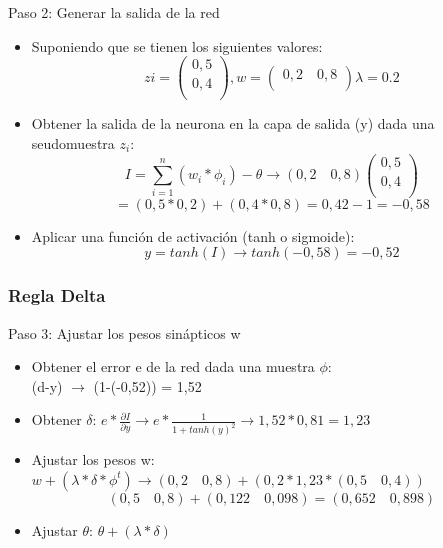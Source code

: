 \documentclass[
	11pt, %
]{beamer}
\begin{document}
\begin{frame}
  Paso 2: Generar la salida de la red

  \begin{itemize}

  \item Suponiendo que se tienen los siguientes valores:
    \[zi = \begin{pmatrix}
      0,5\\
      0,4\\
    \end{pmatrix}, w=\begin{pmatrix} 0,2 \quad 0,8\\ \end{pmatrix} \lambda = 0.2\]

  \item Obtener la salida de la neurona en la capa de salida (y) dada una seudomuestra $z_{i}$:
    \[I = \sum_{i=1} ^{n} (w_{i} * \phi_{i})-\theta \rightarrow (0,2 \quad 0,8)\begin{pmatrix}0,5\\0,4\\\end{pmatrix} \]\[= (0,5*0,2) + (0,4*0,8) = 0,42-1 = -0,58\]

    \item Aplicar una función de activación (tanh o sigmoide):
      \[y = tanh(I) \rightarrow tanh(-0,58) = -0,52\]
      
  \end{itemize}
\end{frame}

\begin{frame}
  \frametitle{Regla Delta}

  Paso 3: Ajustar los pesos sinápticos w

  \bigskip %
  
  \begin{itemize}
  \item Obtener el error e de la red dada una muestra $\phi$: \\
    (d-y) $\rightarrow$ (1-(-0,52)) = 1,52
  \item Obtener $\delta$: $e*\frac{\partial I}{\partial y}\rightarrow e*\frac{1}{1+tanh(y)^{2}} \rightarrow 1,52*0,81 = 1,23$
  \item Ajustar los pesos w: $w+(\lambda*\delta*\phi^{t})\rightarrow (0,2 \quad 0,8)+(0,2*1,23*(0,5 \quad 0,4))$
    \[(0,5 \quad 0,8)+(0,122 \quad 0,098) = (0,652 \quad 0,898)\]
  \item Ajustar $\theta$: $\theta + (\lambda * \delta)$
  \end{itemize}
  
\end{frame}
\end{document}
